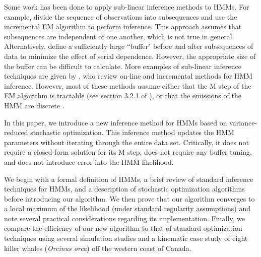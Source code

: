 Some work has been done to apply sub-linear inference methods to HMMs.
For example, \citet{Gotoh:1998} divide the sequence of observations into subsequences
and use the incremental EM algorithm to perform inference. This approach assumes that subsequences are independent of one another, which is not true in general. Alternatively, \citet{Ye:2017} define a sufficiently large ``buffer" before and after subsequences of data to minimize the effect of serial dependence. %
However, the appropriate size of the buffer can be difficult to calculate. %
More examples of sub-linear inference techniques are given by \citet{Khreich:2012}, who review on-line and incremental methods for HMM inference. However, most of these methods assume either that the M step of the EM algorithm is tractable (see section 3.2.1 of \citet{Khreich:2012}), or that the emissions of the HMM are discrete \citep{Baldi:1993}. 

In this paper, we introduce a new inference method for HMMs based on variance-reduced stochastic optimization. This inference method updates the HMM parameters without iterating through the entire data set. Critically, it does not require a closed-form solution for its M step, does not require any buffer tuning, and does not introduce error into the HMM likelihood.

We begin with a formal definition of HMMs, a brief review of standard inference techniques for HMMs, and a description of stochastic optimization algorithms before introducing our algorithm. We then prove that our algorithm converges to a local maximum of the likelihood (under standard regularity assumptions) and note several practical considerations regarding its implementation. Finally, %
we compare the efficiency of our new algorithm to that of standard optimization techniques using several simulation studies and a kinematic case study of eight killer whales ({\em{Orcinus orca}}) off the western coast of Canada.

